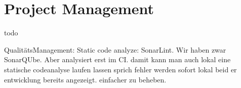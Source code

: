 \section{Project Management}
todo

QualitätsManagement: Static code analyze: SonarLint. \cite{sonar-lint}
Wir haben zwar SonarQUbe. Aber analysiert erst im CI.
damit kann man auch lokal eine statische codeanalyse laufen lassen sprich fehler werden sofort lokal beid er
entwicklung bereits angezeigt. einfacher zu beheben.
